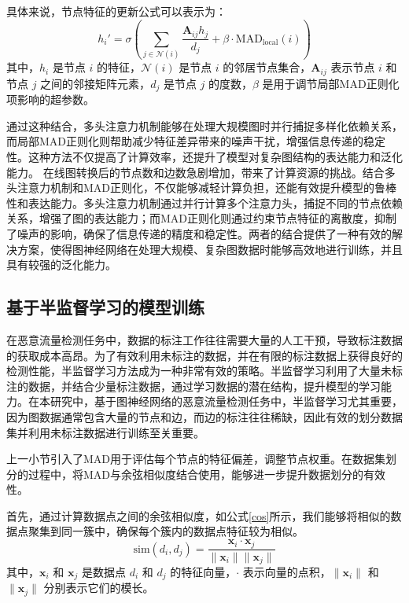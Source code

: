 \documentclass[promaster]{thesis-uestc}
\begin{document}
具体来说，节点特征的更新公式可以表示为：
\begin{equation}
h_i' = \sigma \left( \sum_{j \in \mathcal{N}(i)} \frac{ \mathbf{A}_{ij} h_j}{d_j} + \beta \cdot \text{MAD}_{\text{local}}(i) \right)
\end{equation}
其中，\( h_i \) 是节点 \(i\) 的特征，\( \mathcal{N}(i) \) 是节点 \(i\) 的邻居节点集合，\(\mathbf{A}_{ij}\) 表示节点 \(i\) 和节点 \(j\) 之间的邻接矩阵元素，\(d_j\) 是节点 \(j\) 的度数，\(\beta\) 是用于调节局部MAD正则化项影响的超参数。

通过这种结合，多头注意力机制能够在处理大规模图时并行捕捉多样化依赖关系，而局部MAD正则化则帮助减少特征差异带来的噪声干扰，增强信息传递的稳定性。这种方法不仅提高了计算效率，还提升了模型对复杂图结构的表达能力和泛化能力。
在线图转换后的节点数和边数急剧增加，带来了计算资源的挑战。结合多头注意力机制和MAD正则化，不仅能够减轻计算负担，还能有效提升模型的鲁棒性和表达能力。多头注意力机制通过并行计算多个注意力头，捕捉不同的节点依赖关系，增强了图的表达能力；而MAD正则化则通过约束节点特征的离散度，抑制了噪声的影响，确保了信息传递的精度和稳定性。两者的结合提供了一种有效的解决方案，使得图神经网络在处理大规模、复杂图数据时能够高效地进行训练，并且具有较强的泛化能力。
\subsection{基于半监督学习的模型训练}

在恶意流量检测任务中，数据的标注工作往往需要大量的人工干预，导致标注数据的获取成本高昂。为了有效利用未标注的数据，并在有限的标注数据上获得良好的检测性能，半监督学习方法成为一种非常有效的策略。半监督学习利用了大量未标注的数据，并结合少量标注数据，通过学习数据的潜在结构，提升模型的学习能力。在本研究中，基于图神经网络的恶意流量检测任务中，半监督学习尤其重要，因为图数据通常包含大量的节点和边，而边的标注往往稀缺，因此有效的划分数据集并利用未标注数据进行训练至关重要。

上一小节引入了MAD用于评估每个节点的特征偏差，调整节点权重。在数据集划分的过程中，将MAD与余弦相似度结合使用，能够进一步提升数据划分的有效性。

首先，通过计算数据点之间的余弦相似度，如公式\ref{cos}所示，我们能够将相似的数据点聚集到同一簇中，确保每个簇内的数据点特征较为相似。
\begin{equation}
\text{sim}(d_i, d_j) = \frac{\mathbf{x}_i \cdot \mathbf{x}_j}{\|\mathbf{x}_i\| \|\mathbf{x}_j\|}
\label{cos}
\end{equation}
其中，$\mathbf{x}_i$ 和 $\mathbf{x}_j$ 是数据点 $d_i$ 和 $d_j$ 的特征向量，$\cdot$ 表示向量的点积，$\|\mathbf{x}_i\|$ 和 $\|\mathbf{x}_j\|$ 分别表示它们的模长。
\end{document}

